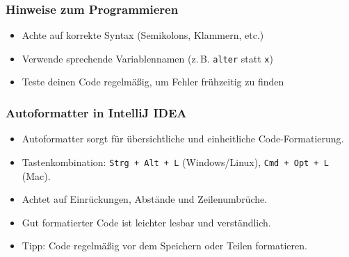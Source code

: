 \documentclass{../../presentation}
\begin{document}
\begin{frame}[fragile]
  \frametitle{Hinweise zum Programmieren}
  \pause
  \begin{itemize}
    \item Achte auf korrekte Syntax (Semikolons, Klammern, etc.)
          \pause
    \item Verwende sprechende Variablennamen (z.\,B. \texttt{alter} statt \texttt{x})
          \pause
    \item Teste deinen Code regelmäßig, um Fehler frühzeitig zu finden
  \end{itemize}
\end{frame}

\begin{frame}
  \frametitle{Autoformatter in IntelliJ IDEA}
  \pause
  \begin{itemize}
    \item Autoformatter sorgt für übersichtliche und einheitliche Code-Formatierung.
          \pause
    \item Tastenkombination: \texttt{Strg + Alt + L} (Windows/Linux), \texttt{Cmd + Opt + L} (Mac).
          \pause
    \item Achtet auf Einrückungen, Abstände und Zeilenumbrüche.
          \pause
    \item Gut formatierter Code ist leichter lesbar und verständlich.
          \pause
    \item Tipp: Code regelmäßig vor dem Speichern oder Teilen formatieren.
  \end{itemize}
\end{frame}
\end{document}
